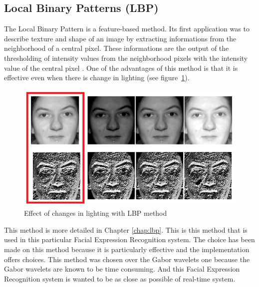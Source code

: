 \subsection{Local Binary Patterns (LBP)}

\vspace{\baselineskip}
\noindent The Local Binary Pattern is a feature-based method. Its first application was to describe texture and shape of an image by extracting informations from the neighborhood of a central pixel. These informations are the output of the thresholding of intensity values from the neighborhood pixels with the intensity value of the central pixel \cite{GAN08}. One of the advantages of this method is that it is effective even when there is change in lighting (see figure~\ref{lbp_change_lighting}).
\newline

\begin{figure}[!h]
\begin{center}
\noindent \includegraphics[scale=0.6]{figures/lbp_change_lighting} 
\newline
\caption{Effect of changes in lighting with LBP method}
\label{lbp_change_lighting}
\end{center} 
\end{figure}

\noindent This method is more detailed in Chapter \ref{chap:lbp}. This is this method that is used in this particular Facial Expression Recognition system. The choice has been made on this method because it is particularly effective and the implementation offers choices. This method was chosen over the Gabor wavelets one because the Gabor wavelets are known to be time consuming. And this Facial Expression Recognition system is wanted to be as close as possible of real-time system.
\newline

